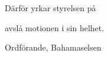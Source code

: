 \documentclass[../_main/handlingar.tex]{subfiles}
\begin{document}
\motionssvar

Därför yrkar styrelsen på

\begin{attsatser}
    \att avslå motionen i sin helhet.
\end{attsatser}

\begin{signatures}{1}
    \ist
    \signature{Fredrik Peterson}{Ordförande, Bahamaselsen}
\end{signatures}
\end{document}
